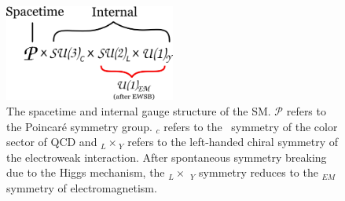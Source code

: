 \begin{figure}[!htb]
	\begin{center}
		\includegraphics[width=0.5\textwidth]{figures/chapter1/sm_forces}
		\caption{
			The spacetime and internal gauge structure of the SM.
			$\mathcal{P}$ refers to the Poincar{\'e} symmetry group.
			\SUthree$_c$ refers to the \SUthree~symmetry
			of the color sector of QCD and \SUtwo$_{L}\times$\Uone$_{Y}$ refers to the left-handed chiral
			symmetry of the electroweak interaction. After spontaneous symmetry
			breaking due to the Higgs mechanism, the \SUtwo$_L \times$ \Uone$_Y$ symmetry
			reduces to the \Uone$_{EM}$ symmetry of electromagnetism. 
		}
		\label{fig:sm_forces}
	\end{center}
\end{figure}
\floatbarrier

